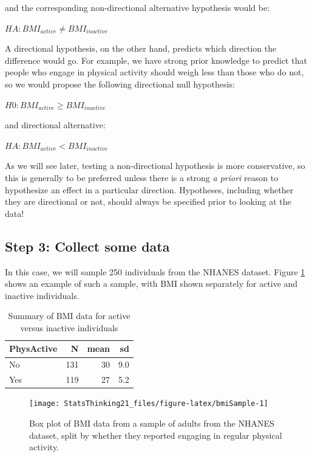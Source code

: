 \documentclass[12pt,]{book}
\theoremstyle{definition}
\theoremstyle{definition}
\theoremstyle{definition}
\theoremstyle{remark}
\begin{document}
and the corresponding non-directional alternative hypothesis would be:

\(HA: BMI_{active} \neq BMI_{inactive}\)

A directional hypothesis, on the other hand, predicts which direction the difference would go. For example, we have strong prior knowledge to predict that people who engage in physical activity should weigh less than those who do not, so we would propose the following directional null hypothesis:

\(H0: BMI_{active} \ge BMI_{inactive}\)

and directional alternative:

\(HA: BMI_{active} < BMI_{inactive}\)

As we will see later, testing a non-directional hypothesis is more conservative, so this is generally to be preferred unless there is a strong \emph{a priori} reason to hypothesize an effect in a particular direction. Hypotheses, including whether they are directional or not, should always be specified prior to looking at the data!

\hypertarget{step-3-collect-some-data}{%
\subsection{Step 3: Collect some data}\label{step-3-collect-some-data}}

In this case, we will sample 250 individuals from the NHANES dataset. Figure \ref{fig:bmiSample} shows an example of such a sample, with BMI shown separately for active and inactive individuals.

\begin{table}

\caption{\label{tab:unnamed-chunk-41}Summary of BMI data for active versus inactive individuals}
\centering
\begin{tabular}[t]{l|r|r|r}
\hline
PhysActive & N & mean & sd\\
\hline
No & 131 & 30 & 9.0\\
\hline
Yes & 119 & 27 & 5.2\\
\hline
\end{tabular}
\end{table}

\begin{figure}
\texttt{[image: StatsThinking21\_files/figure-latex/bmiSample-1]} \caption{Box plot of BMI data from a sample of adults from the NHANES dataset, split by whether they reported engaging in regular physical activity.}\label{fig:bmiSample}
\end{figure}
\end{document}

